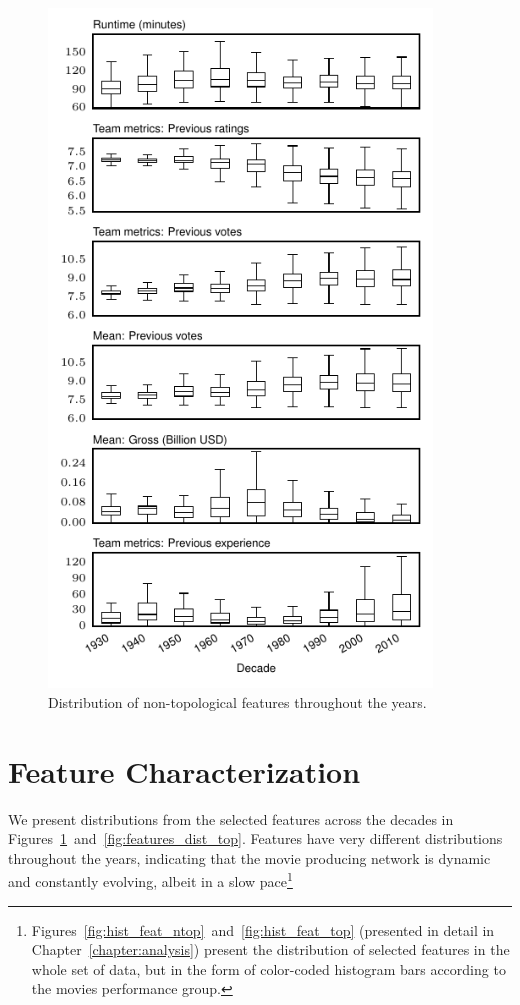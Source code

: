 \begin{figure}[h]\begin{center}
\includegraphics[width=0.7\columnwidth,height=18cm]{../../images/features_dist_ntop.pdf}
\caption{\label{fig:features_dist_ntop}Distribution of non-topological features
throughout the years.}
\end{center}\end{figure}

\section{Feature Characterization}
\label{sec:feature_char}
We present distributions from the selected features across the decades in
Figures~\ref{fig:features_dist_ntop}~and~\ref{fig:features_dist_top}. Features
have very different distributions throughout the years, indicating that the
movie producing network is dynamic and constantly evolving, albeit in a slow
pace\footnote{Figures~\ref{fig:hist_feat_ntop}~and~\ref{fig:hist_feat_top}
(presented in detail in Chapter~\ref{chapter:analysis}) present the
distribution of selected features in the whole set of data, but in the form of
color-coded histogram bars according to the movies performance group.}

